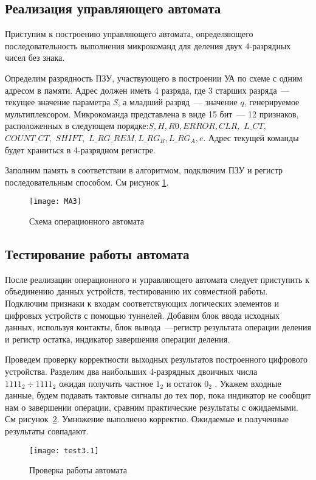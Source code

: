 \documentclass[a4paper,14pt]{extarticle}
\begin{document}
\subsection {Реализация управляющего автомата}
Приступим к построению управляющего автомата, определяющего последовательность выполнения микрокоманд для деления двух 4-разрядных чисел без знака.

Определим разрядность ПЗУ, участвующего в построении УА по схеме с одним адресом в памяти. Адрес должен иметь 4 разряда, где 3 старших разряда~--- текущее значение параметра \textit{S}, а младший разряд~--- значение $q$, генерируемое мультиплексором. Микрокоманда представлена в виде 15 бит~--- 12 признаков, расположенных в следующем порядке:\hspace{0ex}$S, H, R0, ERROR, CLR,$ $L\_CT,$ $COUNT\_CT,$ $SHIFT,$ $L\_RG\_REM, L\_RG_B, L\_RG_A, e$. Адрес текущей команды будет храниться в 4-разрядном регистре.


Заполним память в соответствии в алгоритмом, подключим ПЗУ и регистр последовательным способом. См рисунок \ref{img:ma3}.
\begin{figure}[h!]
	\centering
	\texttt{[image: MA3]}
	\caption {Схема операционного автомата}
	\label{img:ma3}
\end{figure}

\subsection{Тестирование работы автомата}
После реализации операционного и управляющего автомата следует приступить к объединению данных устройств, тестированию их совместной работы. Подключим признаки к входам соответствующих логических элементов и цифровых устройств с помощью туннелей. Добавим блок ввода исходных данных, используя контакты, блок вывода~---регистр результата операции деления и регистр остатка, индикатор завершения операции деления.

Проведем проверку корректности выходных результатов построенного цифрового устройства. Разделим два наибольших 4-разрядных двоичных числа $1111_2 \div 1111_2$ ожидая получить частное $1_2$ и остаток $0_2$ . Укажем входные данные, будем подавать тактовые сигналы до тех пор, пока индикатор не сообщит нам о завершении операции, сравним практические результаты с ожидаемыми. См рисунок~\ref{img:test3.1}. Умножение выполнено корректно. Ожидаемые и полученные результаты совпадают.
\begin{figure}[h!]
	\centering
	\texttt{[image: test3.1]}
	\caption {Проверка работы автомата}
	\label{img:test3.1}
\end{figure}
\end{document}
